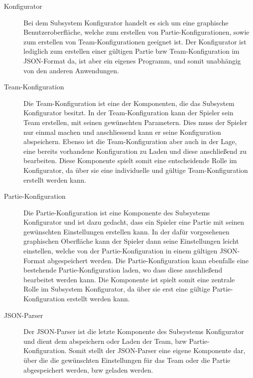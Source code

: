 		\begin{description}
			
			\item[Konfigurator]
			
			Bei dem Subsystem Konfigurator handelt es sich um eine graphische Benutzeroberfläche, welche zum erstellen von Partie-Konfigurationen, sowie zum erstellen von Team-Konfigurationen  geeignet ist. Der Konfigurator ist lediglich zum erstellen einer gültigen Partie bzw Team-Konfiguration im JSON-Format da, ist aber ein eigenes Programm, und somit unabhängig von den anderen Anwendungen.
			
			\item[Team-Konfiguration]
			Die Team-Konfiguration ist eine der Komponenten, die das Subsystem Konfigurator besitzt. In der Team-Konfiguration kann der Spieler sein Team erstellen, mit seinen gewünschten Parametern. Dies muss der Spieler nur einmal machen und anschliessend kann er seine Konfiguration abspeichern. Ebenso ist die Team-Konfiguration aber auch in der Lage, eine bereits vorhandene Konfiguration zu Laden und diese anschließend zu bearbeiten. Diese Komponente spielt somit eine entscheidende Rolle im Konfigurator, da über sie eine individuelle und gültige Team-Konfiguration erstellt werden kann.
			
			\item[Partie-Konfiguration]
			Die Partie-Konfiguration ist eine Komponente des Subsystems Konfigurator und ist dazu gedacht, dass ein Spieler eine Partie mit seinen gewünschten Einstellungen erstellen kann. In der dafür vorgesehenen graphischen Oberfläche kann der Spieler dann seine Einstellungen leicht einstellen, welche von der Partie-Konfiguration in einem gültigen JSON-Format abgespeichert werden. Die Partie-Konfiguration kann ebenfalls eine bestehende Partie-Konfiguration laden, wo dass diese anschließend bearbeitet werden kann. Die Komponente ist spielt somit eine zentrale Rolle im Subsystem Konfigurator, da über sie erst eine gültige Partie-Konfiguration erstellt werden kann.			
			
			\item[JSON-Parser]
			Der JSON-Parser ist die letzte Komponente des Subsystems Konfigurator und dient dem abspeichern oder Laden der Team, bzw Partie-Konfiguration. Somit stellt der JSON-Parser eine eigene Komponente dar, über die die gewünschten Einstellungen für das Team oder die Partie abgespeichert werden, bzw geladen werden. 

		\end{description}
		
